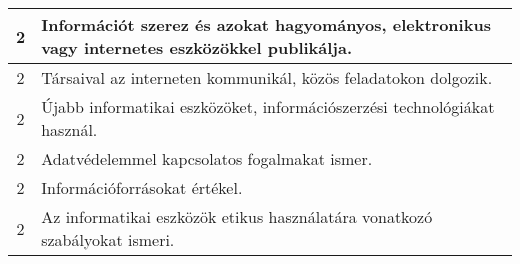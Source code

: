 \begin{longtable}{c | p{12cm} }
                                          2 &  Információt szerez és azokat hagyományos, elektronikus vagy internetes eszközökkel publikálja. \\ \hline
                                          2 &  Társaival az interneten kommunikál, közös feladatokon dolgozik. \\ \hline
                                          2 &  Újabb informatikai eszközöket, információszerzési technológiákat használ. \\ \hline
                                          2 &  Adatvédelemmel kapcsolatos fogalmakat ismer. \\ \hline
                                          2 &  Információforrásokat értékel. \\ \hline
                                          2 &  Az informatikai eszközök etikus használatára vonatkozó szabályokat ismeri. \\ \hline
                                      

\end{longtable}
